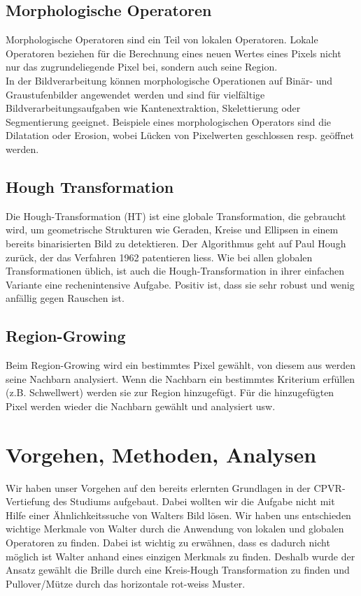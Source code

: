 \documentclass[paper=a4,fontsize=12pt]{scrartcl}
\begin{document}
\subsection*{Morphologische Operatoren}
Morphologische Operatoren sind ein Teil von lokalen Operatoren. Lokale Operatoren beziehen für die Berechnung eines neuen Wertes eines Pixels nicht nur das zugrundeliegende Pixel bei, sondern auch seine Region.\\
In der Bildverarbeitung können morphologische Operationen auf Binär- und Graustufenbilder angewendet werden und sind für vielfältige Bildverarbeitungsaufgaben wie Kantenextraktion, Skelettierung oder Segmentierung geeignet. Beispiele eines morphologischen Operators sind die Dilatation oder Erosion, wobei Lücken von Pixelwerten geschlossen resp. geöffnet werden. 
\subsection*{Hough Transformation}
Die Hough-Transformation (HT) ist eine globale Transformation, die gebraucht wird, um
geometrische Strukturen wie Geraden, Kreise und Ellipsen in einem bereits binarisierten
Bild zu detektieren. Der Algorithmus geht auf Paul Hough zurück, der das Verfahren 1962
patentieren liess.
Wie bei allen globalen Transformationen üblich, ist auch die Hough-Transformation in
ihrer einfachen Variante eine rechenintensive Aufgabe. Positiv ist, dass sie sehr robust
und wenig anfällig gegen Rauschen ist.
\newpage
\subsection*{Region-Growing}
Beim Region-Growing wird ein bestimmtes Pixel gewählt, von diesem aus werden seine Nachbarn analysiert. Wenn die Nachbarn ein bestimmtes Kriterium erfüllen (z.B. Schwellwert) werden sie zur Region hinzugefügt. Für die hinzugefügten Pixel werden wieder die Nachbarn gewählt und analysiert usw.
\section*{Vorgehen, Methoden, Analysen}
Wir haben unser Vorgehen auf den bereits erlernten Grundlagen in der CPVR-Vertiefung des Studiums aufgebaut. Dabei wollten wir die Aufgabe nicht mit Hilfe einer Ähnlichkeitssuche von Walters Bild lösen. Wir haben uns entschieden wichtige Merkmale von Walter durch die Anwendung von lokalen und globalen Operatoren zu finden. Dabei ist wichtig zu erwähnen, dass es dadurch nicht möglich ist Walter anhand eines einzigen Merkmals zu finden. Deshalb wurde der Ansatz gewählt die Brille durch eine Kreis-Hough Transformation zu finden und Pullover/Mütze durch das horizontale rot-weiss Muster.
\end{document}

